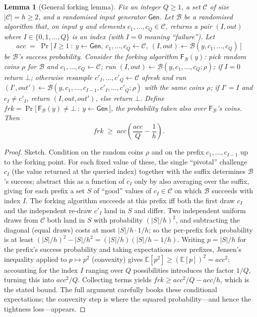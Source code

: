 \documentclass[11pt,a4paper]{article}
\newtheorem{lemma}[theorem]{Lemma}
\theoremstyle{definition}
\theoremstyle{remark}
\newcommand{\E}{\ensuremath{\mathbb{E}}}
\begin{document}
\begin{lemma}[General forking lemma]\label{signatures:lem:forking}
Fix an integer \(Q \ge 1\), a set \(\mathcal{C}\) of size \(|\mathcal{C}| = h \ge 2\), and a randomised input generator \(\mathsf{Gen}\). Let \(\mathcal{B}\) be a randomised algorithm that, on input \(y\) and elements \(c_1, \dots, c_Q \in \mathcal{C}\), returns a pair \((I, \mathit{out})\) where \(I \in \{0, 1, \dots, Q\}\) is an \emph{index} (with \(I = 0\) meaning ``failure''). Let
\[
  \mathit{acc} \;=\; \Pr\!\big[\, I \ge 1 \ : \ y \gets \mathsf{Gen},\ c_1, \dots, c_Q \gets \mathcal{C},\ (I, \mathit{out}) \gets \mathcal{B}(y, c_1, \dots, c_Q) \,\big]
\]
be \(\mathcal{B}\)'s success probability. Consider the \emph{forking algorithm} \(\mathsf{F}_{\mathcal{B}}(y)\): pick random coins \(\rho\) for \(\mathcal{B}\) and \(c_1, \dots, c_Q \gets \mathcal{C}\); run \((I, \mathit{out}) \gets \mathcal{B}(y, c_1, \dots, c_Q; \rho)\); if \(I = 0\) return \(\bot\); otherwise resample \(c'_I, \dots, c'_Q \gets \mathcal{C}\) afresh and run \((I', \mathit{out}') \gets \mathcal{B}(y, c_1, \dots, c_{I-1}, c'_I, \dots, c'_Q; \rho)\) with the \emph{same} coins \(\rho\); if \(I' = I\) and \(c_I \ne c'_I\), return \((I, \mathit{out}, \mathit{out}')\), else return \(\bot\). Define \(\mathit{frk} = \Pr\!\big[\, \mathsf{F}_{\mathcal{B}}(y) \ne \bot \ : \ y \gets \mathsf{Gen} \,\big]\), the probability taken also over \(\mathsf{F}_{\mathcal{B}}\)'s coins. Then
\[
  \mathit{frk} \;\ge\; \mathit{acc} \left( \frac{\mathit{acc}}{Q} - \frac{1}{h} \right).
\]
\end{lemma}

\begin{proof}
Sketch. Condition on the random coins \(\rho\) and on the prefix \(c_1, \dots, c_{I-1}\) up to the forking point. For each fixed value of these, the single ``pivotal'' challenge \(c_I\) (the value returned at the queried index) together with the suffix determines \(\mathcal{B}\)'s success; abstract this as a function of \(c_I\) only by also averaging over the suffix, giving for each prefix a set \(S\) of ``good'' values of \(c_I \in \mathcal{C}\) on which \(\mathcal{B}\) succeeds with index \(I\). The forking algorithm succeeds at this prefix iff both the first draw \(c_I\) and the independent re-draw \(c'_I\) land in \(S\) and differ. Two independent uniform draws from \(\mathcal{C}\) both land in \(S\) with probability \((|S|/h)^2\), and subtracting the diagonal (equal draws) costs at most \(|S|/h \cdot 1/h\); so the per-prefix fork probability is at least \((|S|/h)^2 - |S|/h^2 = (|S|/h)(|S|/h - 1/h)\). Writing \(p = |S|/h\) for the prefix's success probability and taking expectations over prefixes, Jensen's inequality applied to \(p \mapsto p^2\) (convexity) gives \(\E[p^2] \ge (\E[p])^2 = \mathit{acc}^2\); accounting for the index \(I\) ranging over \(Q\) possibilities introduces the factor \(1/Q\), turning this into \(\mathit{acc}^2 / Q\). Collecting terms yields \(\mathit{frk} \ge \mathit{acc}^2/Q - \mathit{acc}/h\), which is the stated bound. The full argument carefully books these conditional expectations; the convexity step is where the squared probability—and hence the tightness loss—appears.
\end{proof}
\end{document}

